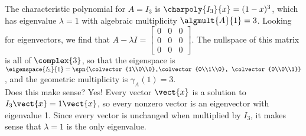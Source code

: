 The characteristic polynomial for $A = I_3$ is $\charpoly{I_3}{x} = (1-x)^3$, which has eigenvalue $\lambda = 1$ with algebraic multiplicity $\algmult{A}{1} = 3$.  
Looking for eigenvectors, we find that 
$A - \lambda I = \begin{bmatrix} 0 & 0 & 0 \\ 0 & 0 & 0\\ 0 & 0 & 0\end{bmatrix}$.  
The nullspace of this matrix is all of $\complex{3}$, so that the eigenspace is 
$\eigenspace{I_3}{1} = \spn{\colvector{1\\0\\0},\colvector{0\\1\\0}, \colvector{0\\0\\1}}$, and the geometric multiplicity is $\gamma_A(1) = 3$.  \\
%
Does this make sense?  Yes!  Every vector $\vect{x}$ is a solution to $I_3\vect{x} = 1\vect{x}$, so every nonzero vector is an eigenvector with eigenvalue 1.  Since every vector is unchanged when multiplied by $I_3$, it makes sense that $\lambda = 1$ is the only eigenvalue.  